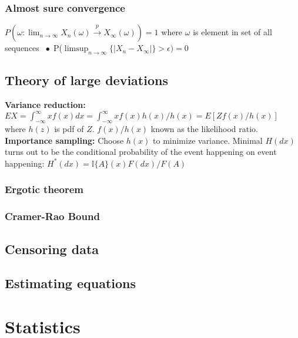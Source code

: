 \documentclass{article}
\newcommand{\abs}[1]{\lvert#1\rvert}
\newcommand*\bspace{$\; \bullet \;$}
\begin{document}
\subsubsection{Almost sure convergence}
$P(\omega : \lim_{n\rightarrow \infty}X_n(\omega) \overset{p}{\rightarrow} X_\infty(\omega)) = 1$ where $\omega$ is element in set of all sequences \bspace P($\limsup_{n \rightarrow \infty}\{\abs{X_n - X_\infty}\} > \epsilon) = 0$

\subsection{Theory of large deviations}
\textbf{Variance reduction: } $EX = \int_{-\infty}^\infty x f(x)dx = \int_{-\infty}^\infty x f(x) h(x) / h(x) = E[Zf(x)/h(x)]$ where $h(z)$ is pdf of $Z$. $f(x) / h(x)$ known as the likelihood ratio.\\
\textbf{Importance sampling:} Choose $h(x)$ to minimize variance. Minimal $H(dx)$ turns out to be the conditional probability of the event happening on event happening: $H^*(dx) = \mathbb{I}\{A\}(x)F(dx)/F(A)$


\subsubsection{Ergotic theorem }
\subsubsection{Cramer-Rao Bound}
\subsection{Censoring data}
\subsection{Estimating equations}



\section{Statistics}
\end{document}
